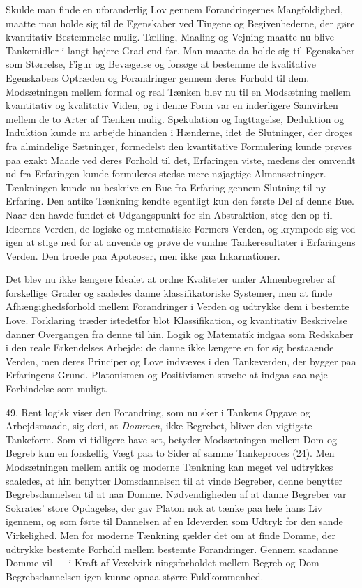\documentclass[12pt,a4paper]{book}
\newcommand{\opage}[1]{\marginnote{\footnotesize\textit{[#1]}}}
\newcommand{\apage}[1]{\marginnote{\footnotesize\textit{[#1]}}}
\begin{document}
Skulde man finde en uforanderlig Lov gennem Forandringernes
Mangfoldighed, maatte man holde sig til de Egenskaber ved Tingene og
Begivenhederne, der gøre kvantitativ Bestemmelse mulig. Tælling, Maaling
og Vejning maatte nu blive Tankemidler i langt højere Grad end før. Man
maatte da holde sig til Egenskaber som Størrelse, Figur og Bevægelse og
forsøge at bestemme de kvalitative Egenskabers Optræden og Forandringer
gennem deres Forhold til dem. Modsætningen mellem formal og real Tænken
blev nu til en Modsætning mellem kvantitativ og kvalitativ Viden, og i
denne Form var en inderligere Samvirken mellem de to Arter af Tænken
mulig. Spekulation og Iagttagelse, Deduktion og Induktion kunde nu
arbejde hinanden i Hænderne, idet de Slutninger, der droges fra
almindelige Sætninger, formedelst den kvantitative Formulering kunde
prøves paa exakt Maade ved deres Forhold til det, Erfaringen viste,
medens der omvendt ud fra Erfaringen kunde formuleres stedse \apage{129} mere
nøjagtige Almensætninger. Tænkningen kunde nu beskrive en Bue fra
Erfaring gennem Slutning til ny Erfaring. Den antike Tænkning kendte
egentligt kun den første Del af denne Bue. Naar den havde fundet et
Udgangspunkt for sin Abstraktion, steg den op til Ideernes Verden, de
logiske og matematiske Formers Verden, og krympede sig ved igen at stige
ned for at anvende og prøve de vundne Tankeresultater i Erfaringens
Verden. Den troede paa Apoteoser, men ikke paa Inkarnationer.

Det blev nu ikke længere Idealet at ordne Kvaliteter under Almenbegreber
af forskellige Grader og saaledes danne klassifikatoriske Systemer, men
at finde Afhængighedsforhold mellem Forandringer i Verden og udtrykke
dem i bestemte Love. Forklaring træder istedetfor blot Klassifikation, og
kvantitativ Beskrivelse danner Overgangen fra denne til hin. Logik og
Matematik indgaa som Redskaber i den reale Erkendelses Arbejde; de danne
ikke længere en for sig bestaaende Verden, men deres Principer og Love
indvæves i den Tankeverden, der bygger paa Erfaringens Grund.
Platonismen og Positivismen stræbe at indgaa saa nøje Forbindelse som
muligt.

49. Rent logisk viser den Forandring, som nu sker i Tankens Opgave og
Arbejdsmaade, sig deri, at \emph{Dommen}, ikke Begrebet, bliver den vigtigste
Tankeform. Som vi tidligere have set, betyder Modsætningen mellem Dom og
Begreb kun en forskellig Vægt paa to Sider af samme Tankeproces (24). Men
Modsætningen mellem antik og moderne Tænkning kan meget vel udtrykkes
saaledes, at hin benytter Domsdannelsen til at vinde Begreber, denne
benytter Begrebsdannelsen til at naa Domme. Nødvendigheden af at danne
Begreber var Sokrates' store Opdagelse, der gav Platon nok at tænke paa
hele hans Liv igennem, og som førte til Dannelsen af en Ideverden som
Udtryk for den sande Virkelighed. Men for moderne Tænkning gælder det om
at finde Domme, der udtrykke bestemte Forhold mellem bestemte
Forandringer. Gennem saadanne Domme vil --- i Kraft af
Vexelvirk%
\opage{130}ningsforholdet mellem Begreb og Dom --- Begrebsdannelsen igen
kunne opnaa større Fuldkommenhed.
\end{document}
